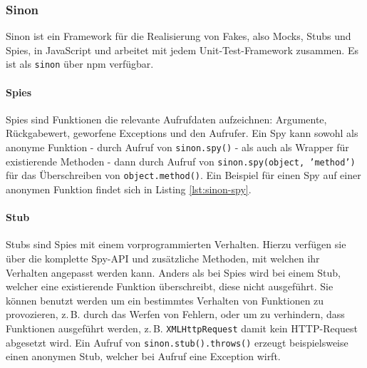 \begin{figure}[H]
	
\end{figure}


\subsubsection{Sinon}
\label{sec:Sinon}
Sinon ist ein Framework für die Realisierung von Fakes, also Mocks, Stubs und Spies, in JavaScript und arbeitet mit jedem Unit-Test-Framework zusammen. Es ist als \texttt{sinon} über npm verfügbar.\cite{sinonjs-index}

\paragraph*{Spies}
Spies sind Funktionen die relevante Aufrufdaten aufzeichnen: Argumente, Rückgabewert, geworfene Exceptions und den Aufrufer. Ein Spy kann sowohl als anonyme Funktion - durch Aufruf von \texttt{sinon.spy()} - als auch als Wrapper für existierende Methoden - dann durch Aufruf von \texttt{sinon.spy(object, 'method')} für das Überschreiben von \texttt{object.method()}.\cite{sinonjs-spies} Ein Beispiel für einen Spy auf einer anonymen Funktion findet sich in Listing \ref{lst:sinon-spy}.

\begin{figure}[H]
	
\end{figure}

\paragraph*{Stub}
Stubs sind Spies mit einem vorprogrammierten Verhalten. Hierzu verfügen sie über die komplette Spy-API und zusätzliche Methoden, mit welchen ihr Verhalten angepasst werden kann. Anders als bei Spies wird bei einem Stub, welcher eine existierende Funktion überschreibt, diese nicht ausgeführt. Sie können benutzt werden um ein bestimmtes Verhalten von Funktionen zu provozieren, z.\,B. durch das Werfen von Fehlern, oder um zu verhindern, dass Funktionen ausgeführt werden, z.\,B. \texttt{XMLHttpRequest} damit kein HTTP-Request abgesetzt wird. Ein Aufruf von \texttt{sinon.stub().throws()} erzeugt beispielsweise einen anonymen Stub, welcher bei Aufruf eine Exception wirft.\cite{sinonjs-stubs}

